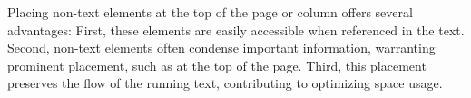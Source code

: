


\noindent Placing non-text elements at the top of the page or column offers several advantages:
First, these elements are easily accessible when referenced in the text.
Second, non-text elements often condense important information, warranting prominent placement, such as at the top of the page.
Third, this placement preserves the flow of the running text, contributing to optimizing space usage.
